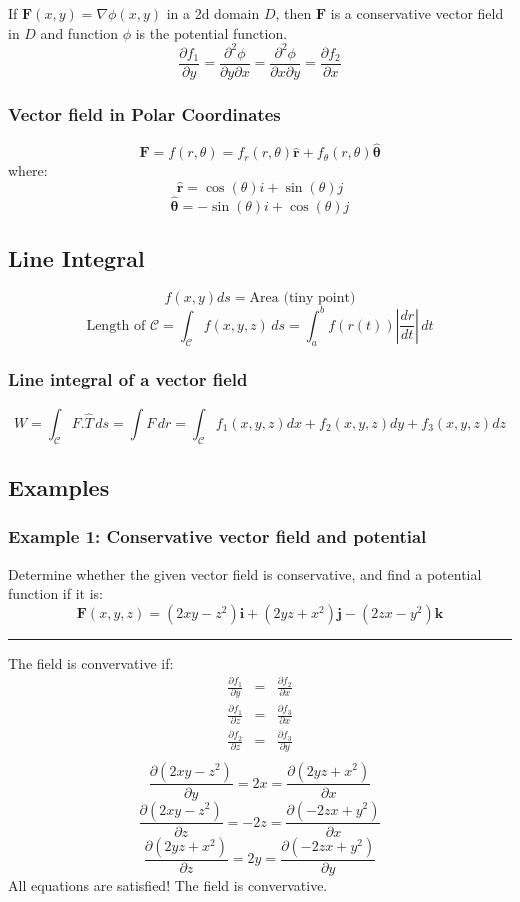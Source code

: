 If $\mathbf{F}(x,y)=\nabla\phi(x,y)$ in a 2d domain $D$, then $\mathbf{F}$ is a conservative vector field in $D$ and function $\phi$ is the potential function.
$${\frac{\partial f_{1}}{\partial y}}={\frac{\partial^{2}\phi}{\partial y\partial x}}={\frac{\partial^{2}\phi}{\partial x\partial y}}={\frac{\partial f_{2}}{\partial x}}$$
\subsubsection{Vector field in Polar Coordinates}
$$\mathbf{F}=f(r,\theta)=f_{r}(r,\theta)\mathbf{\hat{r}}+f_{\theta}(r,\theta)\mathbf{\hat{\theta}}$$
where:
$$\mathbf{\hat{r}}=\cos(\theta)i+\sin(\theta)j$$
$$\mathbf{\hat{\theta}}=-\sin(\theta)i+\cos(\theta)j$$
\subsection{Line Integral}
$$f(x,y)ds=\text{Area (tiny point)}$$
$$\text{Length of }\mathcal{C}=\int _{\mathcal{C}}f(x,y,z) \, ds=\int_{a}^{b}f(r(t)) \left|\frac{ dr }{ dt } \right| \, dt  $$
\subsubsection{Line integral of a vector field}
$$W=\int _{\mathcal{C}}F.\hat{T} \, ds =\int F \,dr =\int _{\mathcal{C}}f_{1}(x,y,z)dx+f_{2}(x,y,z)dy+f_{3}(x,y,z)dz $$
\subsection{Examples}
\subsubsection{Example 1: Conservative vector field and potential}
Determine whether the given vector field is conservative, and find a potential
function if it is:
$$\mathbf{F}(x,y,z)=( 2x y-z^{2})\mathbf{i}+( 2y z+ x^{2})\mathbf{j}-(2z x- y^{2})\mathbf{k}$$ 
\rule{\textwidth}{1pt}

The field is convervative if:
\begin{eqnarray*}
  \frac{\partial f_1}{\partial y}&=&\frac{\partial f_2}{\partial x} \\
  \frac{\partial f_1}{\partial z}&=&\frac{\partial f_3}{\partial x} \\
  \frac{\partial f_2}{\partial z}&=&\frac{\partial f_3}{\partial y} \\
\end{eqnarray*}
$$\frac{\partial (2xy-z^2)}{\partial y}=2x=\frac{\partial (2yz+x^2)}{\partial x} $$
$$ \frac{\partial (2xy-z^2)}{\partial z}=-2z=\frac{\partial (-2zx+y^2)}{\partial x} $$
$$\frac{\partial (2yz+x^2)}{\partial z}=2y=\frac{\partial (-2zx+y^2)}{\partial y} $$
All equations are satisfied! The field is convervative.

